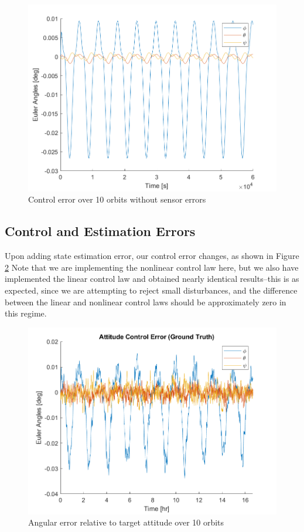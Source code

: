 \begin{figure}[H]
\centering
\includegraphics[scale=0.7]{Images/ps9_problem3_controlError_nonlinear_GT.png}
\caption{Control error over 10 orbits without sensor errors}
\label{fig:ps9_problem3_controlError_nonlinear_GT}
\end{figure}

\subsection{Control and Estimation Errors}
Upon adding state estimation error, our control error changes, as shown in Figure \ref{fig:ps9_problem3_controlError_nonlinear} Note that we are implementing the nonlinear control law here, but we also have implemented the linear control law and obtained nearly identical results–this is as expected, since we are attempting to reject small disturbances, and the difference between the linear and nonlinear control laws should be approximately zero in this regime.

\begin{figure}[H]
\centering
\includegraphics[scale=0.7]{Images/ps9_problem3_controlError_nonlinear.png}
\caption{Angular error relative to target attitude over 10 orbits}
\label{fig:ps9_problem3_controlError_nonlinear}
\end{figure}

